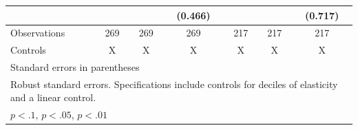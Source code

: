 {\begin{tabular}{l*{6}{c}}
                    &                     &                     &     (0.466)         &                     &                     &     (0.717)         \\
\hline
Observations        &         269         &         269         &         269         &         217         &         217         &         217         \\
Controls            &           X         &           X         &           X         &           X         &           X         &           X         \\
\hline\hline
\multicolumn{7}{l}{\footnotesize Standard errors in parentheses}\\
\multicolumn{7}{l}{\footnotesize Robust standard errors. Specifications include controls for deciles of elasticity and a linear control.}\\
\multicolumn{7}{l}{\footnotesize \sym{*} \(p<.1\), \sym{**} \(p<.05\), \sym{***} \(p<.01\)}\\
\end{tabular}
}
